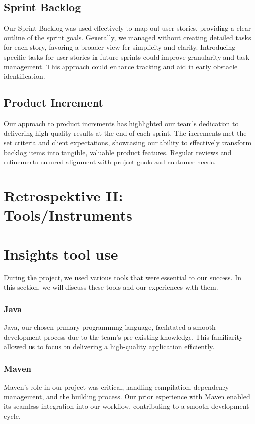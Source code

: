 \subsection{Sprint Backlog}
Our Sprint Backlog was used effectively to map out user stories, providing a clear outline of the sprint goals.
Generally, we managed without creating detailed tasks for each story, favoring a broader view for simplicity and clarity.
Introducing specific tasks for user stories in future sprints could improve granularity and task management.
This approach could enhance tracking and aid in early obstacle identification.

\subsection{Product Increment}
Our approach to product increments has highlighted our team's dedication to delivering high-quality results at the end of each sprint.
The increments met the set criteria and client expectations, showcasing our ability to effectively transform backlog items into tangible, valuable product features.
Regular reviews and refinements ensured alignment with project goals and customer needs.


\section{Retrospektive II: Tools/Instruments}

\section{Insights tool use}
During the project, we used various tools that were essential to our success.
In this section, we will discuss these tools and our experiences with them.

\subsubsection{Java}
Java, our chosen primary programming language, facilitated a smooth development process due to the team's pre-existing knowledge.
This familiarity allowed us to focus on delivering a high-quality application efficiently.

\subsubsection{Maven}
Maven's role in our project was critical, handling compilation, dependency management, and the building process.
Our prior experience with Maven enabled its seamless integration into our workflow, contributing to a smooth development cycle.

